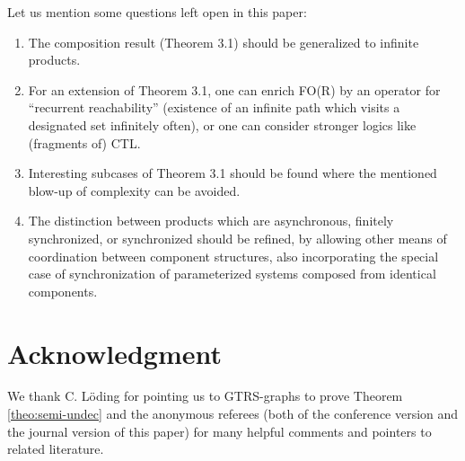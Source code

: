 \documentclass{LMCS}
\begin{document}
Let us mention some questions left open in this paper: 

\begin{enumerate}
\item The composition result (Theorem 3.1) 
should be generalized to infinite products. 
\item For an extension of Theorem 3.1, one can enrich FO(R) by an operator for 
``recurrent reachability'' (existence of an infinite path 
which visits a designated set infinitely often), or one 
can consider stronger logics like (fragments of) CTL.
\item Interesting subcases of Theorem 3.1 should be found where 
the mentioned blow-up of complexity can be avoided.
\item The distinction between products which are asynchronous, 
finitely synchronized, or synchronized should be refined, 
by allowing other means of coordination between component 
structures, also incorporating the special case of synchronization 
of parameterized systems composed from identical components.
\end{enumerate}

\section*{Acknowledgment}

We thank C. L\"oding for pointing us to GTRS-graphs to prove 
Theorem \ref{theo:semi-undec} and
the anonymous referees (both of the conference version and the 
journal version of this paper) for many helpful comments and 
pointers to related literature.







 

\end{document}
